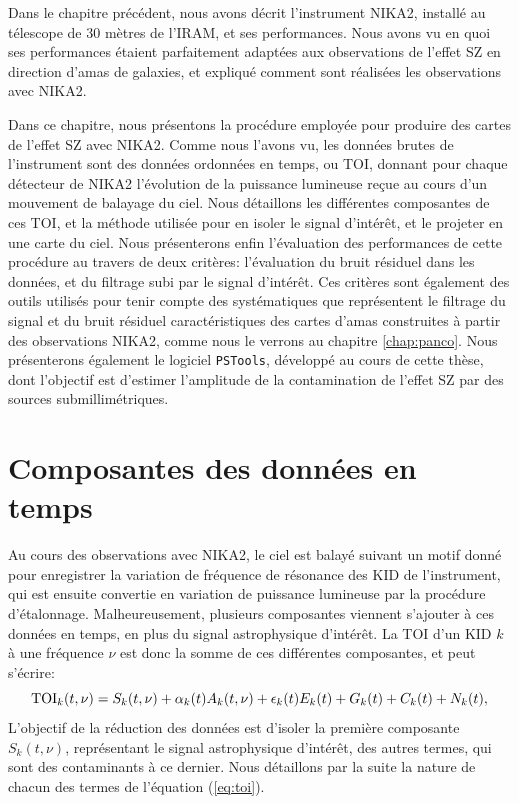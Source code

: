 Dans le chapitre précédent, nous avons décrit l'instrument NIKA2, installé au télescope de 30 mètres de l'IRAM, et ses performances.
Nous avons vu en quoi ses performances étaient parfaitement adaptées aux observations de l'effet SZ en direction d'amas de galaxies, et expliqué comment sont réalisées les observations avec NIKA2.

Dans ce chapitre, nous présentons la procédure employée pour produire des cartes de l'effet SZ avec NIKA2.
Comme nous l'avons vu, les données brutes de l'instrument sont des données ordonnées en temps, ou TOI, donnant pour chaque détecteur de NIKA2 l'évolution de la puissance lumineuse reçue au cours d'un mouvement de balayage du ciel.
Nous détaillons les différentes composantes de ces TOI, et la méthode utilisée pour en isoler le signal d'intérêt, et le projeter en une carte du ciel.
Nous présenterons enfin l'évaluation des performances de cette procédure au travers de deux critères: l'évaluation du bruit résiduel dans les données, et du filtrage subi par le signal d'intérêt.
Ces critères sont également des outils utilisés pour tenir compte des systématiques que représentent le filtrage du signal et du bruit résiduel caractéristiques des cartes d'amas construites à partir des observations NIKA2, comme nous le verrons au chapitre \ref{chap:panco}.
Nous présenterons également le logiciel \texttt{PSTools}, développé au cours de cette thèse, dont l'objectif est d'estimer l'amplitude de la contamination de l'effet SZ par des sources submillimétriques.

\section{Composantes des données en temps}

Au cours des observations avec NIKA2, le ciel est balayé suivant un motif donné pour enregistrer la variation de fréquence de résonance des KID de l'instrument, qui est ensuite convertie en variation de puissance lumineuse par la procédure d'étalonnage.
Malheureusement, plusieurs composantes viennent s'ajouter à ces données en temps, en plus du signal astrophysique d'intérêt.
La TOI d'un KID $k$ à une fréquence $\nu$ est donc la somme de ces différentes composantes, et peut s'écrire:
\begin{equation}
    \label{eq:toi}
    {\rm TOI}_k(t, \nu) = S_k(t, \nu) + \alpha_k(t) A_k(t, \nu) + \epsilon_k(t) E_k(t) + G_k(t) + C_k(t) + N_k(t),
\end{equation}
L'objectif de la réduction des données est d'isoler la première composante $S_k(t, \nu)$, représentant le signal astrophysique d'intérêt, des autres termes, qui sont des contaminants à ce dernier.
Nous détaillons par la suite la nature de chacun des termes de l'équation (\ref{eq:toi}).

